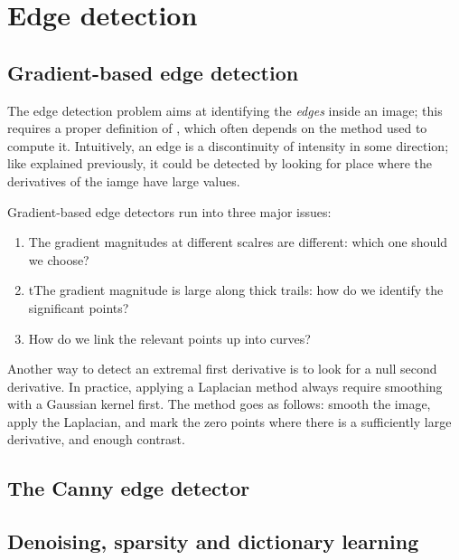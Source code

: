 \section{Edge detection}
\subsection{Gradient-based edge detection}
The edge detection problem aims at identifying the \emph{edges} inside an image; this requires a proper definition of , which often depends on the method used to compute it. Intuitively, an edge is a discontinuity of intensity in some direction; like explained previously, it could be detected by looking for place where the derivatives of the iamge have large values.

Gradient-based edge detectors run into three major issues:
\begin{enumerate}
    \item The gradient magnitudes at different scalres are different: which one should we choose?
    \item tThe gradient magnitude is large along thick trails: how do we identify the significant points?
    \item How do we link the relevant points up into curves?
\end{enumerate}

Another way to detect an extremal first derivative is to look for a null second derivative. In practice, applying a Laplacian method always require smoothing with a Gaussian kernel first. The method goes as follows: smooth the image, apply the Laplacian, and mark the zero points where there is a sufficiently large derivative, and enough contrast.

\subsection{The Canny edge detector}

\subsection{Denoising, sparsity and dictionary learning}